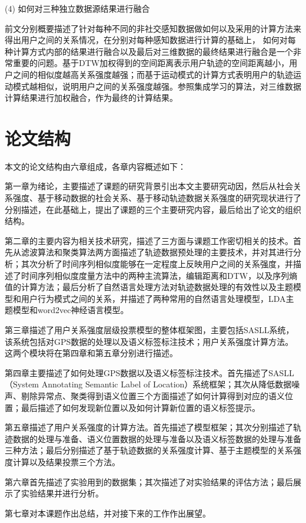 \par (4) 如何对三种独立数据源结果进行融合
\par 前文分别概要描述了针对每种不同的非社交感知数据做如何以及采用的计算方法来得出用户之间的关系情况，在分别对每种感知数据进行计算的基础上， 如何对每种计算方式内部的结果进行融合以及最后对三维数据的最终结果进行融合是一个非常重要的问题。基于DTW加权得到的空间距离表示用户轨迹的空间距离越小，用户之间的相似度越高关系强度越强；而基于运动模式的计算方式表明用户的轨迹运动模式越相似，说明用户之间的关系强度越强。参照集成学习的算法，对三维数据计算结果进行加权融合，作为最终的计算结果。
\section{论文结构}
本文的论文结构由六章组成，各章内容概述如下：
\par 第一章为绪论，主要描述了课题的研究背景引出本文主要研究动因，然后从社会关系强度、基于移动数据的社会关系、基于移动轨迹数据关系强度的研究现状进行了分别描述，在此基础上，提出了课题的三个主要研究内容，最后给出了论文的组织结构。
\par 第二章的主要内容为相关技术研究，描述了三方面与课题工作密切相关的技术。首先从滤波算法和聚类算法两方面描述了轨迹数据预处理的主要技术，并对其进行分析；其次分析了时间序列相似度能够在一定程度上反映用户之间的关系强度，并描述了时间序列相似度度量方法中的两种主流算法，编辑距离和DTW，以及序列熵值的计算方法；最后分析了自然语言处理方法对轨迹数据处理的有效性以及主题模型和用户行为模式之间的关系，并描述了两种常用的自然语言处理模型，LDA主题模型和word2vec神经语言模型。
\par 第三章描述了用户关系强度层级投票模型的整体框架图，主要包括SASLL系统，该系统包括对GPS数据的处理以及语义标签标注技术；用户关系强度计算方法。这两个模块将在第四章和第五章分别进行描述。
\par 第四章主要描述了如何处理GPS数据以及语义标签标注技术。首先描述了SASLL（System Annotating Semantic Label of Location）系统框架；其次从降低数据噪声、剔除异常点、聚类得到语义位置三个方面描述了如何计算得到对应的语义位置；最后描述了如何发现新位置以及如何计算新位置的语义标签提示。
\par 第五章描述了用户关系强度的计算方法。首先描述了模型框架；其次分别描述了轨迹数据的处理与准备、语义位置数据的处理与准备以及语义标签数据的处理与准备三种方法；最后分别描述了基于轨迹数据的关系强度计算、基于主题模型的关系强度计算以及结果投票三个方法。
\par 第六章首先描述了实验用到的数据集；其次描述了对实验结果的评估方法；最后展示了实验结果并进行分析。
\par 第七章对本课题作出总结，并对接下来的工作作出展望。

